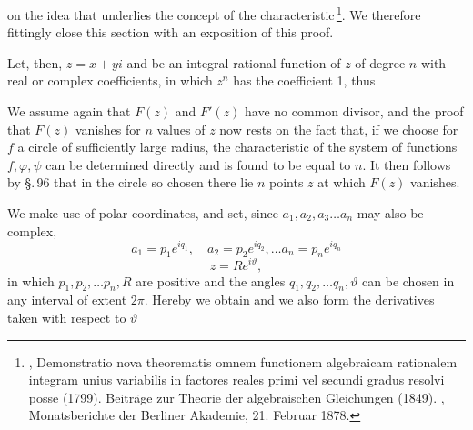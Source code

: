 on the idea that underlies the concept of the characteristic\,\footnote{, Demonstratio nova theorematis omnem functionem algebraicam rationalem integram unius variabilis in factores reales primi vel
secundi gradus resolvi posse (1799). Beiträge zur Theorie der algebraischen
Gleichungen (1849). , Monatsberichte der Berliner Akademie,
21. Februar 1878.}. We therefore fittingly close this section with an
exposition of this proof.

Let, then, $z = x + yi$ and
be an integral rational function of $z$ of degree $n$ with real
or complex coefficients, in which $z^n$ has the coefficient 1,
thus

We assume again that $F(z)$ and $F'(z)$ have no common
divisor, and the proof that $F(z)$ vanishes for $n$
values of $z$ now rests on the fact that, if we
choose for $f$ a circle of sufficiently large radius, the
characteristic of the system of functions $f, \varphi, \psi$ can be determined
directly and is found to be equal to $n$. It then follows by \S.\,96
that in the circle so chosen there lie $n$ points $z$ at which
$F(z)$ vanishes.

We make use of polar coordinates, and set, since
$a_1, a_2, a_3 \dots a_n$ may also be complex,
\[
a_1 = p_1 e^{iq_1},\quad a_2 = p_2 e^{iq_2}, \dots a_n = p_n e^{iq_n}
\]
\[
z = R e^{i\vartheta},
\]
in which $p_1, p_2, \dots p_n, R$ are positive and the angles $q_1, q_2, \dots q_n, \vartheta$
can be chosen in any interval of extent $2\pi$.
Hereby we obtain
and we also form the derivatives taken with respect to $\vartheta$
